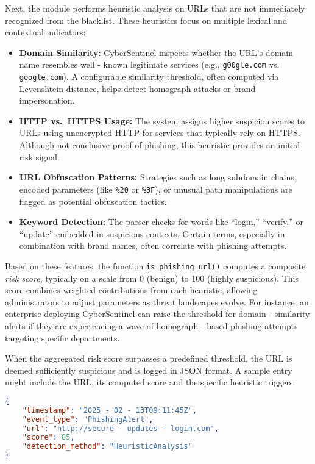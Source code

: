 \documentclass{article}
\begin{document}
Next, the module performs heuristic analysis on URLs that are not immediately recognized from the blacklist. These heuristics focus on multiple lexical and contextual indicators:
\begin{itemize}
    \item \textbf{Domain Similarity:} CyberSentinel inspects whether the URL’s domain name resembles well - known legitimate services (e.g., \texttt{g00gle.com} vs. \texttt{google.com}). A configurable similarity threshold, often computed via Levenshtein distance, helps detect homograph attacks or brand impersonation.
    \item \textbf{HTTP vs.\ HTTPS Usage:} The system assigns higher suspicion scores to URLs using unencrypted HTTP for services that typically rely on HTTPS. Although not conclusive proof of phishing, this heuristic provides an initial risk signal.
    \item \textbf{URL Obfuscation Patterns:} Strategies such as long subdomain chains, encoded parameters (like \texttt{\%20} or \texttt{\%3F}), or unusual path manipulations are flagged as potential obfuscation tactics.
    \item \textbf{Keyword Detection:} The parser checks for words like “login,” “verify,” or “update” embedded in suspicious contexts. Certain terms, especially in combination with brand names, often correlate with phishing attempts.
\end{itemize}

Based on these features, the function \texttt{is\_phishing\_url()} computes a composite \textit{risk score}, typically on a scale from 0 (benign) to 100 (highly suspicious). This score combines weighted contributions from each heuristic, allowing administrators to adjust parameters as threat landscapes evolve. For instance, an enterprise deploying CyberSentinel can raise the threshold for domain - similarity alerts if they are experiencing a wave of homograph - based phishing attempts targeting specific departments.

When the aggregated risk score surpasses a predefined threshold, the URL is deemed sufficiently suspicious and is logged in JSON format. A sample entry might include the URL, its computed score and the specific heuristic triggers:

\begin{lstlisting}[language=json]
{
    "timestamp": "2025 - 02 - 13T09:11:45Z",
    "event_type": "PhishingAlert",
    "url": "http://secure - updates - login.com",
    "score": 85,
    "detection_method": "HeuristicAnalysis"
}
\end{lstlisting}
\end{document}

